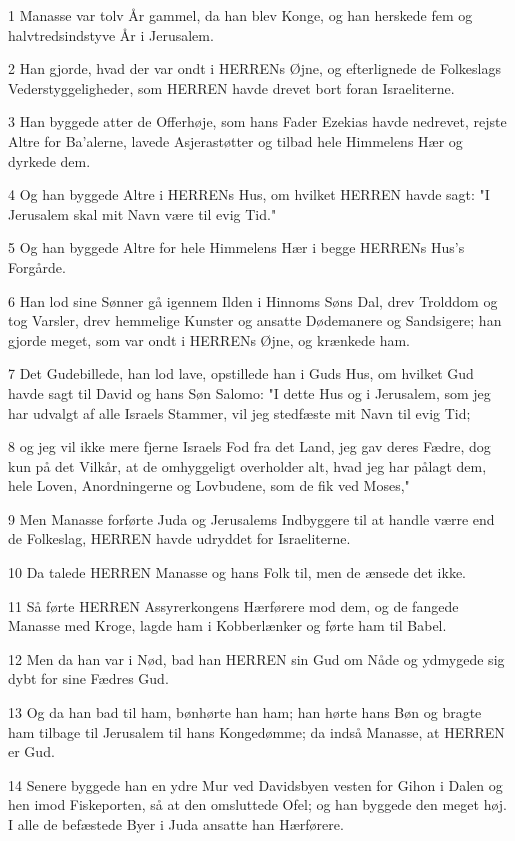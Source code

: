 \par 1 Manasse var tolv År gammel, da han blev Konge, og han herskede fem og halvtredsindstyve År i Jerusalem.
\par 2 Han gjorde, hvad der var ondt i HERRENs Øjne, og efterlignede de Folkeslags Vederstyggeligheder, som HERREN havde drevet bort foran Israeliterne.
\par 3 Han byggede atter de Offerhøje, som hans Fader Ezekias havde nedrevet, rejste Altre for Ba'alerne, lavede Asjerastøtter og tilbad hele Himmelens Hær og dyrkede dem.
\par 4 Og han byggede Altre i HERRENs Hus, om hvilket HERREN havde sagt: "I Jerusalem skal mit Navn være til evig Tid."
\par 5 Og han byggede Altre for hele Himmelens Hær i begge HERRENs Hus's Forgårde.
\par 6 Han lod sine Sønner gå igennem Ilden i Hinnoms Søns Dal, drev Trolddom og tog Varsler, drev hemmelige Kunster og ansatte Dødemanere og Sandsigere; han gjorde meget, som var ondt i HERRENs Øjne, og krænkede ham.
\par 7 Det Gudebillede, han lod lave, opstillede han i Guds Hus, om hvilket Gud havde sagt til David og hans Søn Salomo: "I dette Hus og i Jerusalem, som jeg har udvalgt af alle Israels Stammer, vil jeg stedfæste mit Navn til evig Tid;
\par 8 og jeg vil ikke mere fjerne Israels Fod fra det Land, jeg gav deres Fædre, dog kun på det Vilkår, at de omhyggeligt overholder alt, hvad jeg har pålagt dem, hele Loven, Anordningerne og Lovbudene, som de fik ved Moses,"
\par 9 Men Manasse forførte Juda og Jerusalems Indbyggere til at handle værre end de Folkeslag, HERREN havde udryddet for Israeliterne.
\par 10 Da talede HERREN Manasse og hans Folk til, men de ænsede det ikke.
\par 11 Så førte HERREN Assyrerkongens Hærførere mod dem, og de fangede Manasse med Kroge, lagde ham i Kobberlænker og førte ham til Babel.
\par 12 Men da han var i Nød, bad han HERREN sin Gud om Nåde og ydmygede sig dybt for sine Fædres Gud.
\par 13 Og da han bad til ham, bønhørte han ham; han hørte hans Bøn og bragte ham tilbage til Jerusalem til hans Kongedømme; da indså Manasse, at HERREN er Gud.
\par 14 Senere byggede han en ydre Mur ved Davidsbyen vesten for Gihon i Dalen og hen imod Fiskeporten, så at den omsluttede Ofel; og han byggede den meget høj. I alle de befæstede Byer i Juda ansatte han Hærførere.
